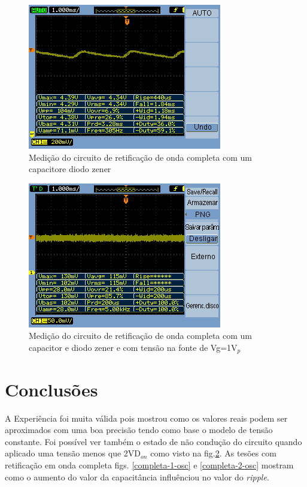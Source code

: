 \begin{figure}[!ht]
\includegraphics[width=0.5\linewidth]{0023.png}
\caption{Medição do circuito de retificação de onda completa com um capacitore diodo zener}
\label{completa-3-osc}
\end{figure} 

\begin{figure}[!ht]
\includegraphics[width=0.5\linewidth]{0024.png}
\caption{Medição do circuito de retificação de onda completa com um capacitor e diodo zener e com tensão na fonte de Vg=1V$_p$}
\label{completa-4-osc}
\end{figure} 
\pagebreak

\section{Conclusões}
A Experiência foi muita válida pois mostrou como os valores reais podem ser aproximados com uma boa precisão tendo como base o modelo de tensão constante. Foi possível ver também o estado de não condução do circuito quando aplicado uma tensão menos que 2VD$_{on}$ como visto na fig.\ref{completa-4-osc}. As tesões com retificação em onda completa figs. \ref{completa-1-osc} e \ref{completa-2-osc} mostram como o aumento do valor da capacitância influênciou no valor do \textit{ripple}.




